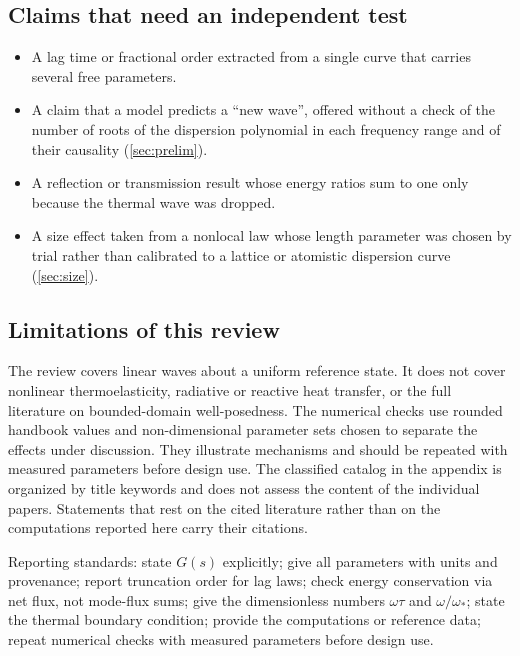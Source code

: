 \subsection{Claims that need an independent test}
\begin{itemize}
\item A lag time or fractional order extracted from a single curve that carries several free parameters.
\item A claim that a model predicts a ``new wave'', offered without a check of the number of roots of the dispersion polynomial in each frequency range and of their causality (\cref{sec:prelim}).
\item A reflection or transmission result whose energy ratios sum to one only because the thermal wave was dropped.
\item A size effect taken from a nonlocal law whose length parameter was chosen by trial rather than calibrated to a lattice or atomistic dispersion curve (\cref{sec:size}).
\end{itemize}

\subsection{Limitations of this review}
The review covers linear waves about a uniform reference state. It does not cover nonlinear thermoelasticity, radiative or reactive heat transfer, or the full literature on bounded-domain well-posedness. The numerical checks use rounded handbook values and non-dimensional parameter sets chosen to separate the effects under discussion. They illustrate mechanisms and should be repeated with measured parameters before design use. The classified catalog in the appendix is organized by title keywords and does not assess the content of the individual papers. Statements that rest on the cited literature rather than on the computations reported here carry their citations.

\begin{summarybox}[Summary]
Reporting standards: state $G(s)$ explicitly; give all parameters with units and provenance; report truncation order for lag laws; check energy conservation via net flux, not mode-flux sums; give the dimensionless numbers $\omega\tau$ and $\omega/\omega_*$; state the thermal boundary condition; provide the computations or reference data; repeat numerical checks with measured parameters before design use.
\end{summarybox}
